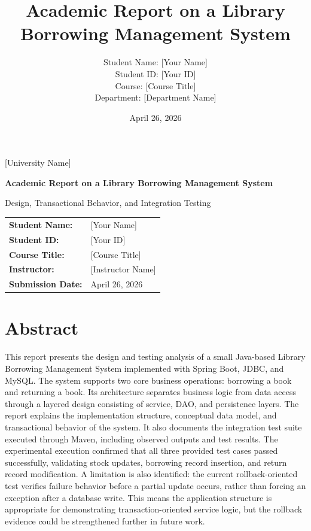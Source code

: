 \documentclass[12pt,a4paper]{report}
\title{Academic Report on a Library Borrowing Management System}
\author{
    Student Name: [Your Name] \\
    Student ID: [Your ID] \\
    Course: [Course Title] \\
    Department: [Department Name]
}
\date{April 26, 2026}
\begin{document}
\begin{titlepage}
    \centering
    \vspace*{2cm}
    {\Large [University Name]\par}
    \vspace{1.5cm}
    {\Huge\bfseries Academic Report on a Library Borrowing Management System\par}
    \vspace{1cm}
    {\Large Design, Transactional Behavior, and Integration Testing\par}
    \vfill
    \begin{tabular}{>{\bfseries}l l}
        Student Name: & [Your Name] \\
        Student ID: & [Your ID] \\
        Course Title: & [Course Title] \\
        Instructor: & [Instructor Name] \\
        Submission Date: & April 26, 2026 \\
    \end{tabular}
    \vfill
\end{titlepage}

\tableofcontents
\clearpage

\chapter*{Abstract}
This report presents the design and testing analysis of a small Java-based Library Borrowing Management System implemented with Spring Boot, JDBC, and MySQL. The system supports two core business operations: borrowing a book and returning a book. Its architecture separates business logic from data access through a layered design consisting of service, DAO, and persistence layers. The report explains the implementation structure, conceptual data model, and transactional behavior of the system. It also documents the integration test suite executed through Maven, including observed outputs and test results. The experimental execution confirmed that all three provided test cases passed successfully, validating stock updates, borrowing record insertion, and return record modification. A limitation is also identified: the current rollback-oriented test verifies failure behavior before a partial update occurs, rather than forcing an exception after a database write. This means the application structure is appropriate for demonstrating transaction-oriented service logic, but the rollback evidence could be strengthened further in future work.
\end{document}
